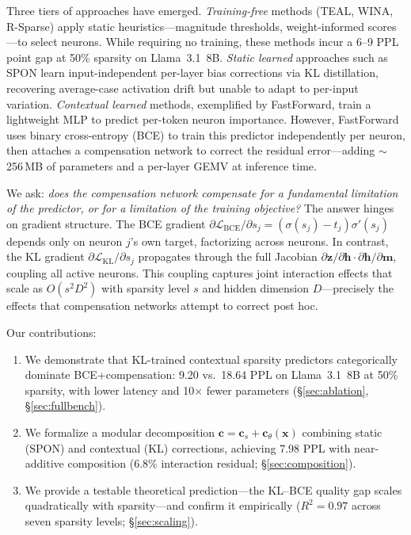 \documentclass[11pt,a4paper]{article}
\begin{document}
Three tiers of approaches have emerged.
\emph{Training-free} methods (TEAL, WINA, R-Sparse) apply static heuristics---magnitude thresholds, weight-informed scores---to select neurons.
While requiring no training, these methods incur a 6--9 PPL point gap at 50\% sparsity on Llama~3.1~8B.
\emph{Static learned} approaches such as SPON learn input-independent per-layer bias corrections via KL distillation, recovering average-case activation drift but unable to adapt to per-input variation.
\emph{Contextual learned} methods, exemplified by FastForward, train a lightweight MLP to predict per-token neuron importance.
However, FastForward uses binary cross-entropy (BCE) to train this predictor independently per neuron, then attaches a compensation network to correct the residual error---adding $\sim$256\,MB of parameters and a per-layer GEMV at inference time.

We ask: \emph{does the compensation network compensate for a fundamental limitation of the predictor, or for a limitation of the training objective?}
The answer hinges on gradient structure.
The BCE gradient $\partial\mathcal{L}_{\mathrm{BCE}}/\partial s_j = (\sigma(s_j) - t_j)\sigma'(s_j)$ depends only on neuron $j$'s own target, factorizing across neurons.
In contrast, the KL gradient $\partial\mathcal{L}_{\mathrm{KL}}/\partial s_j$ propagates through the full Jacobian $\partial\mathbf{z}/\partial\mathbf{h} \cdot \partial\mathbf{h}/\partial\mathbf{m}$, coupling all active neurons.
This coupling captures joint interaction effects that scale as $O(s^2 D^2)$ with sparsity level $s$ and hidden dimension $D$---precisely the effects that compensation networks attempt to correct post hoc.

Our contributions:
\begin{enumerate}
    \item We demonstrate that KL-trained contextual sparsity predictors categorically dominate BCE+compensation: 9.20 vs.\ 18.64 PPL on Llama~3.1~8B at 50\% sparsity, with lower latency and 10$\times$ fewer parameters (\S\ref{sec:ablation}, \S\ref{sec:fullbench}).
    \item We formalize a modular decomposition $\mathbf{c} = \mathbf{c}_s + \mathbf{c}_\theta(\mathbf{x})$ combining static (SPON) and contextual (KL) corrections, achieving 7.98 PPL with near-additive composition (6.8\% interaction residual; \S\ref{sec:composition}).
    \item We provide a testable theoretical prediction---the KL--BCE quality gap scales quadratically with sparsity---and confirm it empirically ($R^2 = 0.97$ across seven sparsity levels; \S\ref{sec:scaling}).
\end{enumerate}
\end{document}
